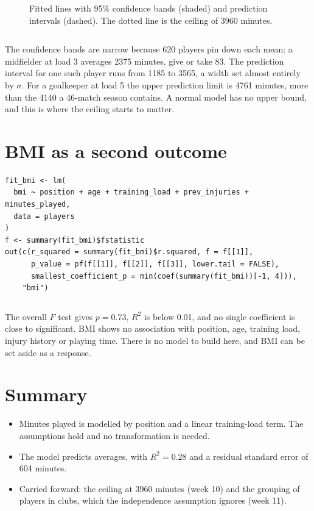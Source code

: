 \documentclass[12pt,notitlepage]{report}
\begin{document}
\begin{figure}[H]
  \centering
  \caption{Fitted lines with 95\% confidence bands (shaded) and prediction
    intervals (dashed). The dotted line is the ceiling of 3960 minutes.}
  \label{fig:intervals}
\end{figure}

\inputminted{text}{output/predictions.txt}

The confidence bands are narrow because 620 players pin down each mean: a
midfielder at load 3 averages 2375 minutes, give or take 83. The prediction
interval for one such player runs from 1185 to 3565, a width set almost
entirely by $\sigma$. For a goalkeeper at load 5 the upper prediction limit is
4761 minutes, more than the 4140 a 46-match season contains. A normal model
has no upper bound, and this is where the ceiling starts to matter.

\section{BMI as a second outcome}

\begin{verbatim}
fit_bmi <- lm(
  bmi ~ position + age + training_load + prev_injuries + minutes_played,
  data = players
)
f <- summary(fit_bmi)$fstatistic
out(c(r_squared = summary(fit_bmi)$r.squared, f = f[[1]],
      p_value = pf(f[[1]], f[[2]], f[[3]], lower.tail = FALSE),
      smallest_coefficient_p = min(coef(summary(fit_bmi))[-1, 4])),
    "bmi")
\end{verbatim}

\inputminted{text}{output/bmi.txt}

The overall $F$ test gives $p = 0.73$, $R^2$ is below 0.01, and no single
coefficient is close to significant. BMI shows no association with position,
age, training load, injury history or playing time. There is no model to build
here, and BMI can be set aside as a response.

\section{Summary}

\begin{itemize}
  \item Minutes played is modelled by position and a linear training-load
    term. The assumptions hold and no transformation is needed.
  \item The model predicts averages, with $R^2 = 0.28$ and a residual standard
    error of 604 minutes.
  \item Carried forward: the ceiling at 3960 minutes (week 10) and the
    grouping of players in clubs, which the independence assumption ignores
    (week 11).
\end{itemize}
\end{document}
